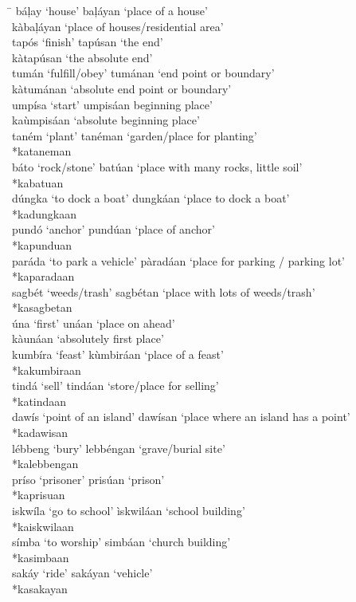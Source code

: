 \begin{tabbing}
\hspace{4.5cm} \= \kill
báļay ‘house’ \> baļáyan ‘place of a house’ \\
\>  kàbaļáyan ‘place of houses/residential area’ \\
tapós ‘finish’ \> tapúsan ‘the end’ \\
\>  kàtapúsan ‘the absolute end’ \\
tumán ‘fulfill/obey’ \> tumánan ‘end point or boundary’ \\
\>  kàtumánan ‘absolute end point or boundary’ \\
umpísa ‘start’ \> umpisáan beginning place’ \\
\>   kaùmpisáan ‘absolute beginning place’ \\
taném ‘plant’ \> tanéman ‘garden/place for planting’ \\
\>  *kataneman \\
báto ‘rock/stone’ \> batúan ‘place with many rocks, little soil’ \\
\>   *kabatuan \\
dúngka ‘to dock a boat’ \> dungkáan ‘place to dock a boat’ \\
\>   *kadungkaan \\
pundó ‘anchor’ \> pundúan ‘place of anchor’ \\
\>   *kapunduan \\
paráda ‘to park a vehicle’ \>  pàradáan ‘place for parking / parking lot’ \\
\>   *kaparadaan \\
sagbét ‘weeds/trash’ \> sagbétan ‘place with lots of weeds/trash’ \\
\>   *kasagbetan \\
úna ‘first’ \> unáan ‘place on ahead’ \\
\>   kàunáan ‘absolutely first place’ \\
kumbíra ‘feast’ \> kùmbiráan ‘place of a feast’ \\
\>   *kakumbiraan \\
tindá ‘sell’ \>  tindáan ‘store/place for selling’ \\
\>   *katindaan \\
dawís ‘point of an island’ \>  dawísan ‘place where an island has a point’ \\
\>   *kadawisan \\
lébbeng ‘bury’ \> lebbéngan ‘grave/burial site’ \\
\>   *kalebbengan \\
príso ‘prisoner’ \> prisúan ‘prison’ \\
\>   *kaprisuan \\
iskwíla ‘go to school' \> ìskwiláan ‘school building’ \\
\>   *kaiskwilaan \\
símba ‘to worship’ \> simbáan ‘church building’ \\
\>   *kasimbaan \\
sakáy ‘ride’ \>  sakáyan ‘vehicle’ \\
\>   *kasakayan \\
\end{tabbing}
